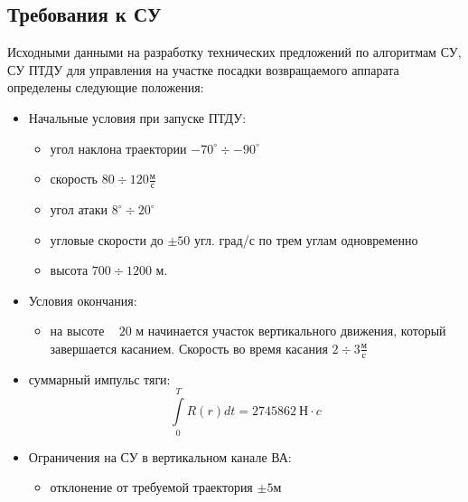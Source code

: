 \clearpage

\subsection{Требования к СУ}
Исходными данными на разработку технических предложений по алгоритмам СУ, СУ ПТДУ для управления на участке посадки возвращаемого аппарата определены следующие положения:
\begin{itemize}
	\item Начальные условия при запуске ПТДУ:
	\begin{itemize}
		\item угол наклона траектории $-70^{\circ} \div -90^{\circ}$
		\item скорость $80 \div 120 \frac{\text{м}}{\text{с}}$
		\item угол атаки $8^{\circ} \div 20^{\circ} $
		\item угловые скорости до $\pm 50$ угл. град/с по трем углам одновременно
		\item высота $700 \div 1200$ м.
	\end{itemize}
	\item Условия окончания:
	\begin{itemize}
		\item на высоте ~ $20$ м начинается участок вертикального движения, который завершается касанием. Скорость во время касания $2 \div 3 \frac{\text{м}}{\text{с}}$
	\end{itemize}
	\item суммарный импульс тяги:
	$$\int \limits_{0}^T R(r) dt = 2745862 \ \text{Н} \cdot c$$
	\item Ограничения на СУ в вертикальном канале ВА:
	\begin{itemize}
		\item отклонение от требуемой траектория $\pm 5 \text{м}$
	\end{itemize}
\end{itemize}
\clearpage